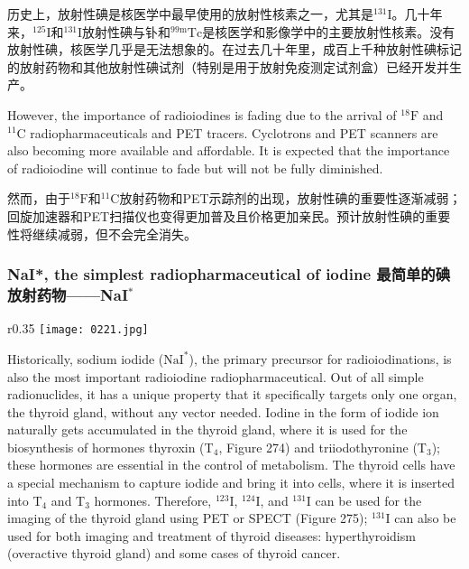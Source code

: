 \documentclass[dvipsnames, svgnames,a4paper,11pt]{article}
\begin{document}
历史上，放射性碘是核医学中最早使用的放射性核素之一，尤其是\(\mathrm{^{131}I}\)。几十年来，\(\mathrm{^{125}I}\)和\(\mathrm{^{131}I}\)放射性碘与钋和\(\mathrm{^{99m}Tc}\)是核医学和影像学中的主要放射性核素。没有放射性碘，核医学几乎是无法想象的。在过去几十年里，成百上千种放射性碘标记的放射药物和其他放射性碘试剂（特别是用于放射免疫测定试剂盒）已经开发并生产。  

However, the importance of radioiodines is fading due to the arrival of \(\mathrm{^{18}F}\) and \(\mathrm{^{11}C}\) radiopharmaceuticals and PET tracers. Cyclotrons and PET scanners are also becoming more available and affordable. It is expected that the importance of radioiodine will continue to fade but will not be fully diminished.

然而，由于\(\mathrm{^{18}F}\)和\(\mathrm{^{11}C}\)放射药物和PET示踪剂的出现，放射性碘的重要性逐渐减弱；回旋加速器和PET扫描仪也变得更加普及且价格更加亲民。预计放射性碘的重要性将继续减弱，但不会完全消失。

\subsubsection{NaI*, the simplest radiopharmaceutical of iodine 最简单的碘放射药物——NaI\(^*\)}  

\begin{wrapfigure}{r}{0.35\textwidth}
    \centering
    \texttt{[image: 0221.jpg]}
     \label{fig274}
\end{wrapfigure}

Historically, sodium iodide (\(\mathrm{NaI^*}\)), the primary precursor for radioiodinations, is also the most important radioiodine radiopharmaceutical. Out of all simple radionuclides, it has a unique property that it specifically targets only one organ, the thyroid gland, without any vector needed. Iodine in the form of iodide ion naturally gets accumulated in the thyroid gland, where it is used for the biosynthesis of hormones thyroxin (T${}_4$, Figure 274) and triiodothyronine (T${}_3$); these hormones are essential in the control of metabolism. The thyroid cells have a special mechanism to capture iodide and bring it into cells, where it is inserted into T${}_4$ and T${}_3$ hormones. Therefore, \(\mathrm{^{123}I}\), \(\mathrm{^{124}I}\), and \(\mathrm{^{131}I}\) can be used for the imaging of the thyroid gland using PET or SPECT (Figure 275); \(\mathrm{^{131}I}\) can also be used for both imaging and treatment of thyroid diseases: hyperthyroidism (overactive thyroid gland) and some cases of thyroid cancer.  
\end{document}
